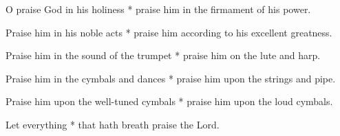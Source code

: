 O praise God in his holiness * praise him in the firmament of his power.

Praise him in his noble acts * praise him according to his excellent greatness.

Praise him in the sound of the trumpet * praise him on the lute and harp.

Praise him in the cymbals and dances * praise him upon the strings and pipe.

Praise him upon the well-tuned cymbals * praise him upon the loud cymbals.

Let everything * that hath breath praise the Lord.